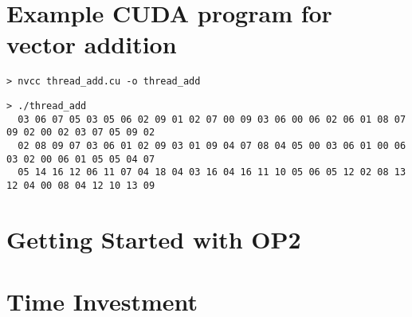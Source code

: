 

\appendixpage
\setcounter{section}{0}
\renewcommand{\thesection}{\Alph{section}}

\section{Example CUDA program for vector addition}
\label{app:cudaEx}

\begin{adjustwidth}{-.5in}{-.5in}
\begin{verbatim}
> nvcc thread_add.cu -o thread_add
\end{verbatim}
\end{adjustwidth}
\begin{adjustwidth}{-.5in}{-.5in}
\begin{verbatim}
> ./thread_add
  03 06 07 05 03 05 06 02 09 01 02 07 00 09 03 06 00 06 02 06 01 08 07 09 02 00 02 03 07 05 09 02
  02 08 09 07 03 06 01 02 09 03 01 09 04 07 08 04 05 00 03 06 01 00 06 03 02 00 06 01 05 05 04 07
  05 14 16 12 06 11 07 04 18 04 03 16 04 16 11 10 05 06 05 12 02 08 13 12 04 00 08 04 12 10 13 09
\end{verbatim}
\end{adjustwidth}
\section{Getting Started with OP2}
\label{app:getStart}

\section{Time Investment}

